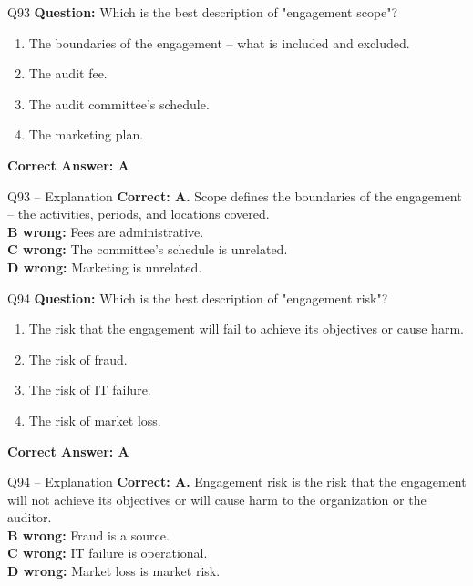 \documentclass[aspectratio=169,10pt]{beamer}
\begin{document}
	\begin{frame}[t]{Q93}
		\small
		\textbf{Question:} Which is the best description of "engagement scope"?
		\begin{enumerate}[label=\Alph*.,itemsep=1pt,topsep=2pt]
			\item The boundaries of the engagement -- what is included and excluded.
			\item The audit fee.
			\item The audit committee's schedule.
			\item The marketing plan.
		\end{enumerate}
		\vspace{4pt}
		\textbf{Correct Answer: A}
	\end{frame}
	
	\begin{frame}[t]{Q93 -- Explanation}
		\small
		\textbf{Correct: A.} Scope defines the boundaries of the engagement -- the activities, periods, and locations covered. \\[4pt]
		\textbf{B wrong:} Fees are administrative. \\[2pt]
		\textbf{C wrong:} The committee's schedule is unrelated. \\[2pt]
		\textbf{D wrong:} Marketing is unrelated.
	\end{frame}
	
	\begin{frame}[t]{Q94}
		\small
		\textbf{Question:} Which is the best description of "engagement risk"?
		\begin{enumerate}[label=\Alph*.,itemsep=1pt,topsep=2pt]
			\item The risk that the engagement will fail to achieve its objectives or cause harm.
			\item The risk of fraud.
			\item The risk of IT failure.
			\item The risk of market loss.
		\end{enumerate}
		\vspace{4pt}
		\textbf{Correct Answer: A}
	\end{frame}
	
	\begin{frame}[t]{Q94 -- Explanation}
		\small
		\textbf{Correct: A.} Engagement risk is the risk that the engagement will not achieve its objectives or will cause harm to the organization or the auditor. \\[4pt]
		\textbf{B wrong:} Fraud is a source. \\[2pt]
		\textbf{C wrong:} IT failure is operational. \\[2pt]
		\textbf{D wrong:} Market loss is market risk.
	\end{frame}
	
\end{document}
